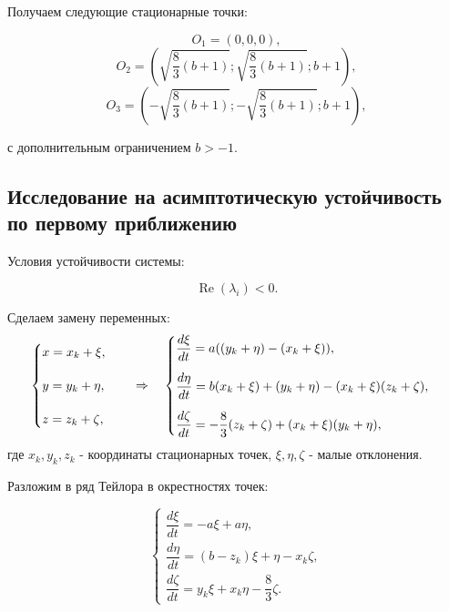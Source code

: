\documentclass[14pt,a4paper]{extarticle}
\theoremstyle{plain}
\begin{document}
	Получаем следующие стационарные точки:
	
	\begin{equation}
		O_1 = (0, 0, 0),\nonumber
	\end{equation}
	\begin{equation}
		O_2 = \left( \sqrt{\frac{8}{3}(b+1)}; \sqrt{\frac{8}{3}(b+1)}; b+1 \right),\nonumber
	\end{equation}
	\begin{equation}
		O_3 = \left( -\sqrt{\frac{8}{3}(b+1)}; -\sqrt{\frac{8}{3}(b+1)}; b+1 \right),\nonumber
	\end{equation}
	
	с дополнительным ограничением $b > -1$.
	
	\subsection{Исследование на асимптотическую устойчивость по первому приближению}
	
	Условия устойчивости системы:
	
	\begin{equation}
		\operatorname{Re}(\lambda_{i})<0.\nonumber
	\end{equation}
	
	Сделаем замену переменных:
	\begin{equation}
		\centering
		\begin{cases}
			x = x_k + \xi, \\[12pt]
			y = y_k + \eta, \\[12pt]
			z = z_k + \zeta,
		\end{cases}
		\quad \Rightarrow \quad
		\begin{cases}
			\dfrac{d\xi}{dt}=a((y_{k}+\eta)-(x_{k}+\xi)),\\[12pt]
			\dfrac{d\eta}{dt}=b(x_{k}+\xi)+(y_{k}+\eta)-(x_{k}+\xi)(z_{k}+\zeta),\\[12pt]
			\dfrac{d\zeta}{dt}=-\dfrac{8}{3}(z_{k}+\zeta)+(x_{k}+\xi)(y_{k}+\eta),
		\end{cases}\nonumber
		\label{eq:linearization}
	\end{equation}
	где $x_{k},y_{k},z_{k}$ - координаты стационарных точек, $\xi,\eta,\zeta$ - малые отклонения.
	
	Разложим в ряд Тейлора в окрестностях точек:
	
	\begin{equation}
		\begin{cases}
			\dfrac{d\xi}{dt} = -a\xi + a\eta, \\[12pt]
			\dfrac{d\eta}{dt} = (b - z_k)\xi + \eta - x_k\zeta, \\[12pt]
			\dfrac{d\zeta}{dt} = y_k\xi + x_k\eta - \dfrac{8}{3}\zeta.
		\end{cases}
		\nonumber
	\end{equation}
	
\end{document}
